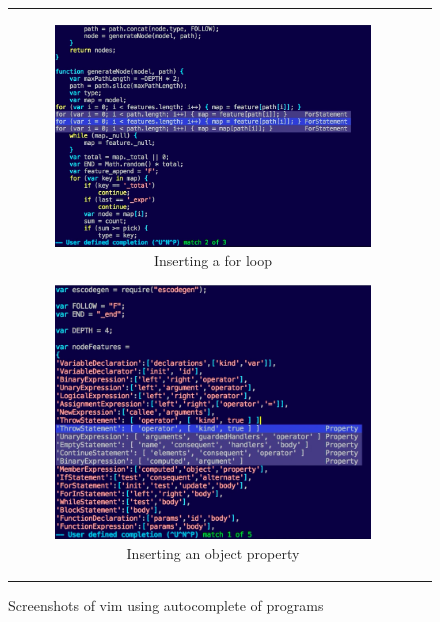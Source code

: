 \documentclass{article}
\begin{document}
\begin{figure}[ht]
	\centering
	\begin{tabular}{c c}
		\begin{subfigure}[h]{6.25cm}
			\centering
			\includegraphics[width=1.00\textwidth]{vim1}
			\caption{Inserting a for loop} \label{fig:vim1}
		\end{subfigure}
		\begin{subfigure}[h]{6cm}
			\centering
			\includegraphics[width=1.00\textwidth]{vim2}
			\caption{Inserting an object property} \label{fig:vim2}
		\end{subfigure}
	\end{tabular}
	\caption{Screenshots of vim using autocomplete of programs}
\end{figure}
\end{document}
